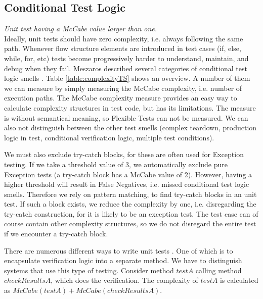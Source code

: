 \documentclass{uvamscse}
\begin{document}
\subsection{Conditional Test Logic}
\label{sec:ctl}
\emph{Unit test having a McCabe value larger than one.} \\

Ideally, unit tests should have zero complexity, i.e. always following the same path. Whenever flow structure elements are introduced in test cases (if, else, while, for, etc) tests become progressively harder to understand, maintain, and debug when they fail. Meszaros described several categories of conditional test logic smells \cite{meszaros2007xunit}. Table \ref{table:complexityTS} shows an overview. A number of them we can measure by simply measuring the McCabe complexity, i.e. number of execution paths. The McCabe complexity measure provides an easy way to calculate complexity structures in test code, but has its limitations. The measure is without semantical meaning, so Flexible Tests can not be measured. We can also not distinguish between the other test smells (complex teardown, production logic in test, conditional verification logic, multiple test conditions). 

We must also exclude try-catch blocks, for these are often used for Exception testing. If we take a threshold value of 3, we automatically exclude pure Exception tests (a try-catch block has a McCabe value of 2). However, having a higher threshold will result in False Negatives, i.e. missed conditional test logic smells. Therefore we rely on pattern matching, to find try-catch blocks in an unit test. If such a block exists, we reduce the complexity by one, i.e. disregarding the try-catch construction, for it is likely to be an exception test. The test case can of course contain other complexity structures, so we do not disregard the entire test if we encounter a try-catch block.

There are numerous different ways to write unit tests \cite{meszaros2007xunit}. One of which is to encapsulate verification logic into a separate method. We have to distinguish systems that use this type of testing. Consider method $testA$ calling method $checkResultsA$, which does the verification. The complexity of $testA$ is calculated as $McCabe(testA) + McCabe(checkResultsA)$. 
\end{document}
